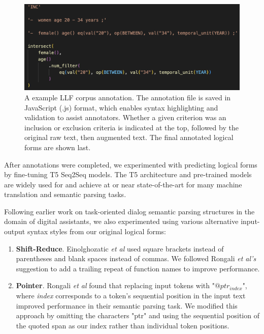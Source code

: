 \documentclass[../main.tex]{subfiles}
\begin{document}
\begin{figure}[h!]
  \centering
  \includegraphics[scale=0.8]{Figures/Aim2/aim2_leafai_annotation_example.png}  
  \caption{A example LLF corpus annotation. The annotation file is saved in JavaScript (.js) format, which enables syntax highlighting and validation to assist annotators. Whether a given criterion was an inclusion or exclusion criteria is indicated at the top, followed by the original raw text, then augmented text. The final annotated logical forms are shown last.}
\label{aim2_annotation_example}
\end{figure}

After annotations were completed, we experimented with predicting logical forms by fine-tuning T5 \cite{raffel2020exploring} Seq2Seq models. The T5 architecture and pre-trained models are widely used for and achieve at or near state-of-the-art for many machine translation and semantic parsing tasks. 

Following earlier work on task-oriented dialog semantic parsing structures in the domain of digital assistants, we also experimented using various alternative input-output syntax styles from our original logical forms:

\begin{enumerate}
    \item \textbf{Shift-Reduce}. Einolghozatic \textit{et al} \cite{einolghozati2019improving} used square brackets instead of parentheses and blank spaces instead of commas. We followed Rongali \textit{et al's} suggestion to add a trailing repeat of function names to improve performance.
    \item \textbf{Pointer}. Rongali \textit{et al} found that replacing input tokens with "$@ptr_{index}$", where \textit{index} corresponds to a token's sequential position in the input text improved performance in their semantic parsing task. We modified this approach by omitting the characters "ptr" and using the sequential position of the quoted span as our index rather than individual token positions.
\end{enumerate}
\end{document}
